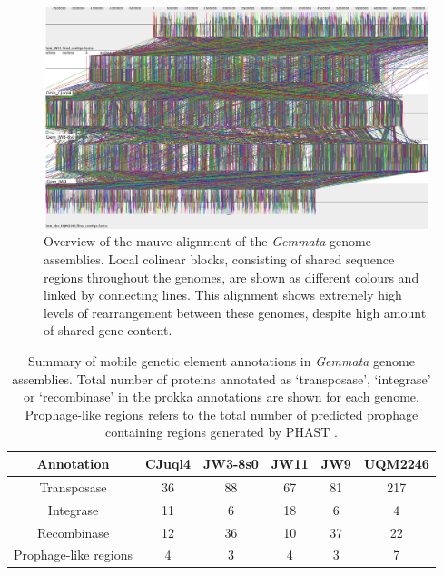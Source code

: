 \begin{figure}[H]
    \centering
    \includegraphics[scale=0.8]{assembly/mauve.png}
    \caption[Overview of the mauve alignment of the \textit{Gemmata} genome assemblies]{Overview of the mauve alignment of the \textit{Gemmata} genome assemblies. Local colinear blocks, consisting of shared sequence regions throughout the genomes, are shown as different colours and linked by connecting lines. This alignment shows extremely high levels of rearrangement between these genomes, despite high amount of shared gene content.}
    \label{fig:mauve}
\end{figure}

\begin{table}[H]
    \footnotesize
    \centering
\begin{tabular}{cccccc}\toprule
Annotation & CJuql4 & JW3-8s0 & JW11 & JW9 & UQM2246\\\midrule
Transposase & 36 & 88 & 67 & 81 & 217 \\
Integrase & 11 & 6 & 18 & 6 & 4\\
Recombinase & 12 & 36 & 10 & 37 & 22 \\
Prophage-like regions & 4 & 3 & 4 & 3 & 7 \\
\bottomrule
    \end{tabular}
    \caption[Summary of mobile genetic element annotations in \textit{Gemmata} genome assemblies]{Summary of mobile genetic element annotations in \textit{Gemmata} genome assemblies. Total number of proteins annotated as `transposase', `integrase' or `recombinase' in the prokka annotations are shown for each genome. Prophage-like regions refers to the total number of predicted prophage containing regions generated by PHAST \citep{Zhou2011-es}.}
    \label{tab:gemmata_MGEs}
\end{table}

